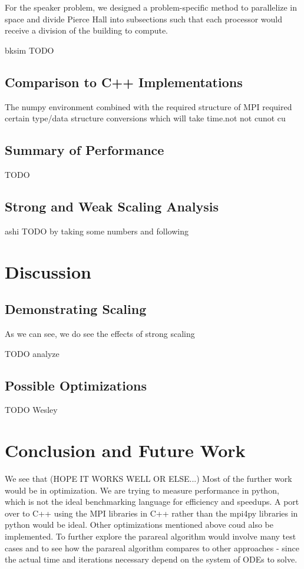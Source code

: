 \documentclass[letterpaper,twocolumn,11pt]{article}
\begin{document}
For the speaker problem, we designed a problem-specific method to parallelize in space and divide Pierce Hall into subsections such that each processor would receive a division of the building to compute.

bksim TODO

\subsection{Comparison to C++ Implementations}
	The numpy environment combined with the required structure of MPI required certain type/data structure conversions which will take time.not not cunot cu

\subsection{Summary of Performance}

TODO

\subsection{Strong and Weak Scaling Analysis}

ashi TODO by taking some numbers and following %

\section{Discussion}

\subsection{Demonstrating Scaling}

As we can see, we do see the effects of strong scaling

TODO analyze


\subsection{Possible Optimizations}

TODO Wesley

\section{Conclusion and Future Work}

We see that (HOPE IT WORKS WELL OR ELSE...)
Most of the further work would be in optimization.  We are trying to measure performance in python, which is not the ideal benchmarking language for efficiency and speedups.  A port over to C++ using the MPI libraries in C++ rather than the mpi4py libraries in python would be ideal.  Other optimizations mentioned above coud also be implemented.  To further explore the parareal algorithm would involve many test cases and to see how the parareal algorithm compares to other approaches - since the actual time and iterations necessary depend on the system of ODEs to solve.
\end{document}
